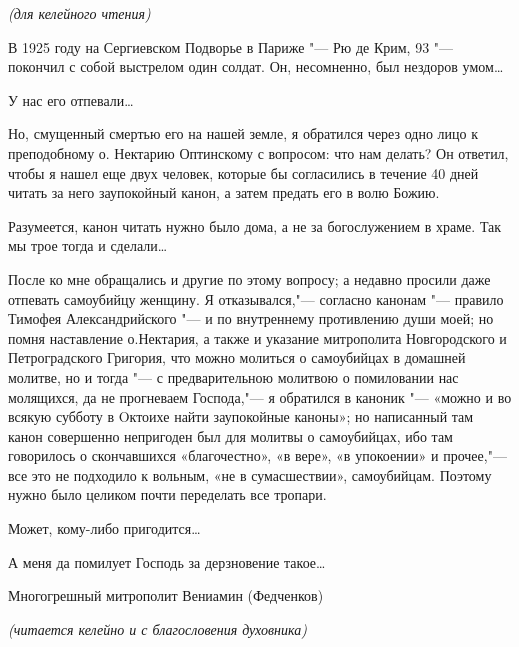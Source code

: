 \mychapterending


\begin{mymulticols}
 


{\itshape (для келейного чтения)


В 1925 году на Сергиевском Подворье в Париже "--- Рю де Крим, 93 "--- покончил с собой выстрелом один солдат. Он, несомненно, был нездоров умом…


У нас его отпевали…


Но, смущенный смертью его на нашей земле, я обратился через одно лицо к преподобному о. Нектарию Оптинскому с вопросом: что нам делать? Он ответил, чтобы я нашел еще двух человек, которые бы согласились в течение 40 дней читать за него заупокойный канон, а затем предать его в волю Божию.


Разумеется, канон читать нужно было дома, а не за богослужением в храме. Так мы трое тогда и сделали…


После ко мне обращались и другие по этому вопросу; а недавно просили даже отпевать самоубийцу женщину. Я отказывался,"--- согласно канонам "--- правило Тимофея Александрийского "--- и по внутреннему противлению души моей; но помня наставление о.Нектария, а также и указание митрополита Новгородского и Петроградского Григория, что можно молиться о самоубийцах в домашней молитве, но и тогда "--- с предварительною молитвою о помиловании нас молящихся, да не прогневаем Господа,"--- я обратился в каноник "--- «можно и во всякую субботу в Oктоихе найти заупокойные каноны»; но написанный там канон совершенно непригоден был для молитвы о самоубийцах, ибо там говорилось о скончавшихся «благочестно», «в вере», «в упокоении» и прочее,"--- все это не подходило к вольным, «не в сумасшествии», самоубийцам. Поэтому нужно было целиком почти переделать все тропари.


Может, кому-либо пригодится…


А меня да помилует Господь за дерзновение такое…


Многогрешный митрополит Вениамин (Федченков)} 


 {\noparindent \itshape \centering (читается келейно и с благословения духовника)}






\end{mymulticols}
